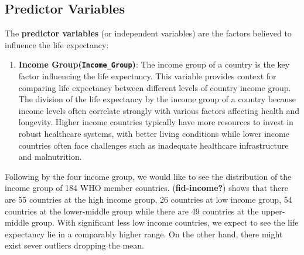 \documentclass[
  letterpaper,
  DIV=11,
  numbers=noendperiod]{scrartcl}
\providecommand{\tightlist}{%
  \setlength{\itemsep}{0pt}\setlength{\parskip}{0pt}}\usepackage{longtable,booktabs,array}
\begin{document}
\subsection{Predictor Variables}\label{predictor-variables}

The \textbf{predictor variables} (or independent variables) are the
factors believed to influence the life expectancy:

\begin{enumerate}
\def\labelenumi{\arabic{enumi}.}
\tightlist
\item
  \textbf{Income Group(\texttt{Income\_Group})}: The income group of a
  country is the key factor influencing the life expectancy. This
  variable provides context for comparing life expectancy between
  different levels of country income group. The division of the life
  expectancy by the income group of a country because income levels
  often correlate strongly with various factors affecting health and
  longevity. Higher income countries typically have more resources to
  invest in robust healthcare systems, with better living conditions
  while lower income countries often face challenges such as inadequate
  healthcare infrastructure and malnutrition.
\end{enumerate}

Following by the four income group, we would like to see the
distribution of the income group of 184 WHO member countries.
(\textbf{fid-income?}) shows that there are 55 countries at the high
income group, 26 countries at low income group, 54 countries at the
lower-middle group while there are 49 countries at the upper-middle
group. With significant less low income countries, we expect to see the
life expectancy lie in a comparably higher range. On the other hand,
there might exist sever outliers dropping the mean.
\end{document}
